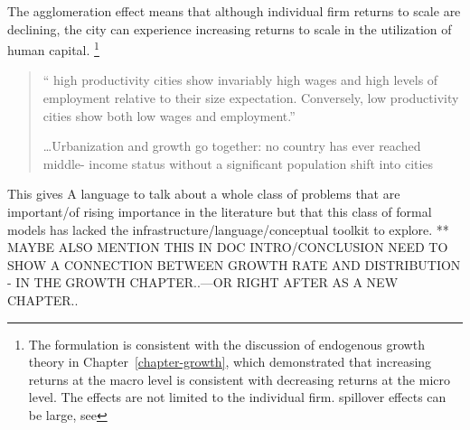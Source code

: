 \documentclass[a4paper]{article}
\theoremstyle{definition}
\theoremstyle{plain}
\begin{document}
{The %
{agglomeration effect} means that although individual firm returns to scale are declining, the city can experience %
{increasing returns to scale} in the utilization of human capital. %
\footnote{The formulation is consistent with the discussion of endogenous growth theory in Chapter~\ref{chapter-growth}, which demonstrated that increasing returns at the macro level is consistent with decreasing returns at the micro level. The effects are not limited to the individual firm. %
{spillover effects} can be large, see %
}






\begin{quotation}`` high productivity cities show invariably high wages and high levels of employment relative to their size expectation. Conversely, low productivity cities show both low wages and employment.''

\dots Urbanization and growth go together: no country has ever reached middle- income status without a significant population shift into cities \cite{annezUrbanizationGrowthSetting2009}\end{quotation}




This gives 
A language to talk about a whole class of problems that are important/of rising importance in the literature but that this class of formal models has lacked the infrastructure/language/conceptual toolkit to explore. ** MAYBE ALSO MENTION THIS IN DOC INTRO/CONCLUSION
NEED TO SHOW A CONNECTION BETWEEN GROWTH RATE AND DISTRIBUTION - IN THE GROWTH CHAPTER..---OR RIGHT AFTER AS A NEW CHAPTER..





}
\end{document}

